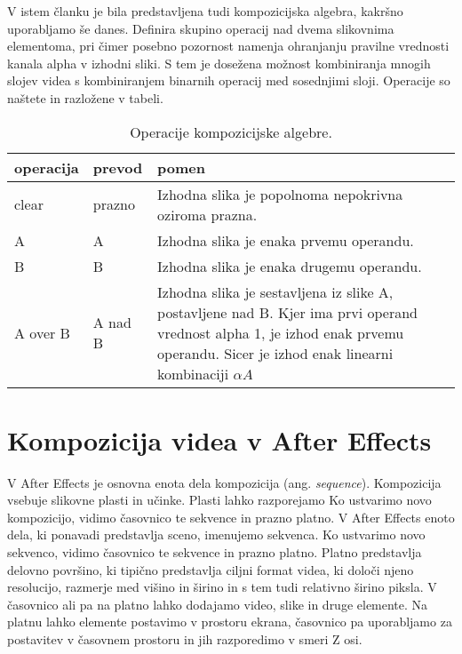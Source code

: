 \documentclass[a4paper, 12pt]{book}
\begin{document}
V istem članku je bila predstavljena tudi kompozicijska algebra, kakršno uporabljamo še danes.
Definira skupino operacij nad dvema slikovnima elementoma, pri čimer posebno pozornost namenja ohranjanju pravilne vrednosti kanala alpha v izhodni sliki.
S tem je dosežena možnost kombiniranja mnogih slojev videa s kombiniranjem binarnih operacij med sosednjimi sloji.
Operacije so naštete in razložene v tabeli. %

\begin{table}
\begin{center}
\begin{tabular}{p{} | p{} | p{} }
\hline
{\bf operacija} & {\bf prevod } & {\bf pomen} \\ \hline
clear & prazno & Izhodna slika je popolnoma nepokrivna oziroma prazna. \\ \hline
A & A & Izhodna slika je enaka prvemu operandu. \\
B & B & Izhodna slika je enaka drugemu operandu. \\ \hline
A over B & A nad B & Izhodna slika je sestavljena iz slike A, postavljene nad B. Kjer ima prvi operand vrednost alpha 1, je izhod enak prvemu operandu. 
Sicer je izhod enak linearni kombinaciji $\alpha A  $  \\ %
\end{tabular}
\end{center}
\caption{Operacije kompozicijske algebre.}
\label{tbl:kompOperacije}
\end{table}




\section{Kompozicija videa v After Effects}

V After Effects je osnovna enota dela kompozicija (ang. {\it sequence}).
Kompozicija vsebuje slikovne plasti in učinke. 
Plasti lahko razporejamo
Ko ustvarimo novo kompozicijo, vidimo časovnico te sekvence in prazno platno.
V After Effects enoto dela, ki ponavadi predstavlja sceno, imenujemo sekvenca\cite{aeclassroom}.
Ko ustvarimo novo sekvenco, vidimo časovnico te sekvence in prazno platno.
Platno predstavlja delovno površino, ki tipično predstavlja ciljni format videa, ki določi njeno resolucijo, razmerje med višino in širino in s tem tudi relativno širino piksla.
V časovnico ali pa na platno lahko dodajamo video, slike in druge elemente.
Na platnu lahko elemente postavimo v prostoru ekrana,
časovnico pa uporabljamo za postavitev v časovnem prostoru in jih razporedimo v smeri Z osi.
\end{document}
